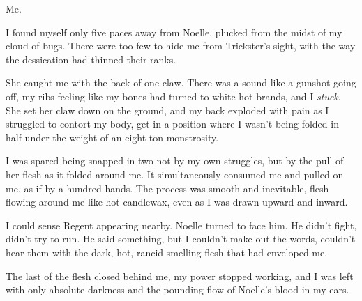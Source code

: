 Me.



I found myself only five paces away from Noelle, plucked from the midst of my cloud of bugs.  There were too few to hide me from Trickster's sight, with the way the dessication had thinned their ranks.



She caught me with the back of one claw.  There was a sound like a gunshot going off, my ribs feeling like my bones had turned to white-hot brands, and I \emph{stuck}.  She set her claw down on the ground, and my back exploded with pain as I struggled to contort my body, get in a position where I wasn't being folded in half under the weight of an eight ton monstrosity.



I was spared being snapped in two not by my own struggles, but by the pull of her flesh as it folded around me.  It simultaneously consumed me and pulled on me, as if by a hundred hands.  The process was smooth and inevitable, flesh flowing around me like hot candlewax, even as I was drawn upward and inward.



I could sense Regent appearing nearby.  Noelle turned to face him.  He didn't fight, didn't try to run.  He said something, but I couldn't make out the words, couldn't hear them with the dark, hot, rancid-smelling flesh that had enveloped me.



The last of the flesh closed behind me, my power stopped working, and I was left with only absolute darkness and the pounding flow of Noelle's blood in my ears.





